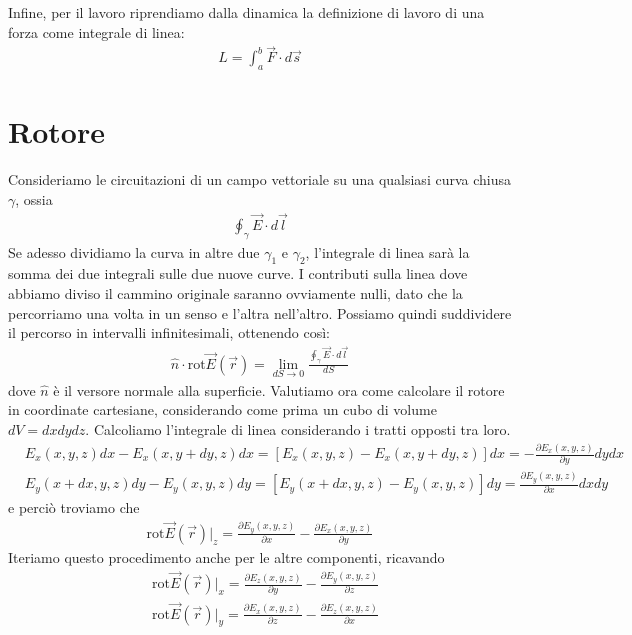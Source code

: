 \documentclass{book}
\begin{document}
\noindent Infine, per il lavoro riprendiamo dalla dinamica la definizione di lavoro di una forza come integrale di linea:
\begin{align*}
    L = \int _a^b \vec{F} \cdot  d\vec{s}
\end{align*}
\section{Rotore}
Consideriamo le circuitazioni di un campo vettoriale su una qualsiasi curva chiusa $\gamma$, ossia
\begin{align*}
    \oint_{\gamma} \vec{E} \cdot d\vec{l}
\end{align*}
Se adesso dividiamo la curva in altre due $\gamma_1$ e $\gamma_2$, l'integrale di linea sarà la somma dei due integrali sulle due nuove curve. I contributi sulla linea dove abbiamo diviso il cammino originale saranno ovviamente nulli, dato che la percorriamo una volta in un senso e l'altra nell'altro.
Possiamo quindi suddividere il percorso in intervalli infinitesimali, ottenendo così:
\begin{align*}
    \hat{n}\cdot \text{rot} \vec{E} (\vec{r}) = \lim _{dS\to 0} \frac{\oint_{\gamma} \vec{E} \cdot d\vec{l}}{dS}
\end{align*}
dove $\hat{n}$ è il versore normale alla superficie.
Valutiamo ora come calcolare il rotore in coordinate cartesiane, considerando come prima un cubo di volume $dV = dxdydz$. Calcoliamo l'integrale di linea considerando i tratti opposti tra loro.
\begin{align*}
   &E_x (x,y,z)dx- E_x (x, y+dy, z) dx = [ E_x (x, y, z) - E_x (x, y+dy, z )] dx = - \frac{\partial E_x (x,y,z)}{\partial y} dy dx \\
   & E_y (x+ dx, y, z)dy - E_y(x, y, z)dy =[E_y (x+dx, y, z) - E_y (x, y, z)] dy = \frac{\partial E_y (x,y,z)}{\partial x} dxdy
\end{align*}
e perciò troviamo che 
\begin{align*}
     \text{rot} \vec{E} (\vec{r})|_{z}  =\frac{\partial E_y (x,y,z)}{\partial x} - \frac{\partial E_x (x,y,z)}{\partial y}
\end{align*}
Iteriamo questo procedimento anche per le altre componenti, ricavando 
\begin{align*}
    &\text{rot} \vec{E} (\vec{r})|_{x} = \frac{\partial E_z (x,y,z)}{\partial y} - \frac{\partial E_y (x,y,z)}{\partial z} \\
    &\text{rot} \vec{E} (\vec{r})|_{y} = \frac{\partial E_x (x,y,z)}{\partial z} - \frac{\partial E_z (x,y,z)}{\partial x}
\end{align*}
\end{document}
